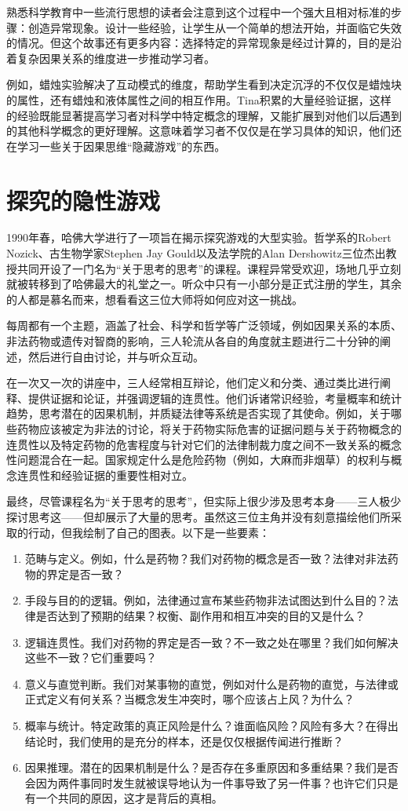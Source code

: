 熟悉科学教育中一些流行思想的读者会注意到这个过程中一个强大且相对标准的步骤：创造异常现象。设计一些经验，让学生从一个简单的想法开始，并面临它失效的情况。但这个故事还有更多内容：选择特定的异常现象是经过计算的，目的是沿着复杂因果关系的维度进一步推动学习者。

例如，蜡烛实验解决了互动模式的维度，帮助学生看到决定沉浮的不仅仅是蜡烛块的属性，还有蜡烛和液体属性之间的相互作用。Tina积累的大量经验证据，这样的经验既能显著提高学习者对科学中特定概念的理解，又能扩展到对他们以后遇到的其他科学概念的更好理解。这意味着学习者不仅仅是在学习具体的知识，他们还在学习一些关于因果思维“隐藏游戏”的东西。

\section*{探究的隐性游戏}

1990年春，哈佛大学进行了一项旨在揭示探究游戏的大型实验。哲学系的Robert Nozick、古生物学家Stephen Jay Gould以及法学院的Alan Dershowitz三位杰出教授共同开设了一门名为“关于思考的思考”的课程。课程异常受欢迎，场地几乎立刻就被转移到了哈佛最大的礼堂之一。听众中只有一小部分是正式注册的学生，其余的人都是慕名而来，想看看这三位大师将如何应对这一挑战。

每周都有一个主题，涵盖了社会、科学和哲学等广泛领域，例如因果关系的本质、非法药物或遗传对智商的影响，三人轮流从各自的角度就主题进行二十分钟的阐述，然后进行自由讨论，并与听众互动。

在一次又一次的讲座中，三人经常相互辩论，他们定义和分类、通过类比进行阐释、提供证据和论证，并强调逻辑的连贯性。他们诉诸常识经验，考量概率和统计趋势，思考潜在的因果机制，并质疑法律等系统是否实现了其使命。例如，关于哪些药物应该被定为非法的讨论，将关于药物实际危害的证据问题与关于药物概念的连贯性以及特定药物的危害程度与针对它们的法律制裁力度之间不一致关系的概念性问题混合在一起。国家规定什么是危险药物（例如，大麻而非烟草）的权利与概念连贯性和经验证据的重要性相对立。

最终，尽管课程名为“关于思考的思考”，但实际上很少涉及思考本身——三人极少探讨思考这——但却展示了大量的思考。虽然这三位主角并没有刻意描绘他们所采取的行动，但我绘制了自己的图表。以下是一些要素：
\begin{enumerate}
    \item 范畴与定义。例如，什么是药物？我们对药物的概念是否一致？法律对非法药物的界定是否一致？
    \item 手段与目的的逻辑。例如，法律通过宣布某些药物非法试图达到什么目的？法律是否达到了预期的结果？权衡、副作用和相互冲突的目的又是什么？
    \item 逻辑连贯性。我们对药物的界定是否一致？不一致之处在哪里？我们如何解决这些不一致？它们重要吗？
    \item 意义与直觉判断。我们对某事物的直觉，例如对什么是药物的直觉，与法律或正式定义有何关系？当概念发生冲突时，哪个应该占上风？为什么？
    \item 概率与统计。特定政策的真正风险是什么？谁面临风险？风险有多大？在得出结论时，我们使用的是充分的样本，还是仅仅根据传闻进行推断？
    \item 因果推理。潜在的因果机制是什么？是否存在多重原因和多重结果？我们是否会因为两件事同时发生就被误导地认为一件事导致了另一件事？也许它们只是有一个共同的原因，这才是背后的真相。
\end{enumerate}


